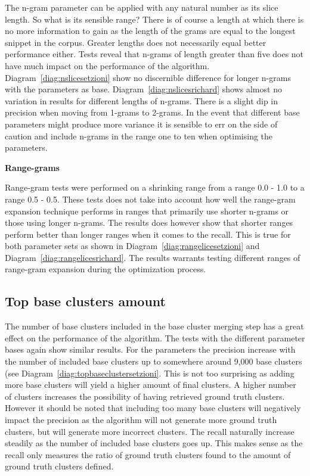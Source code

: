 The n-gram parameter can be applied with any natural number as its slice length. So what is its sensible range? There is of course a length at which there is no more information to gain as the length of the grams are equal to the longest snippet in the corpus. Greater lengths does not necessarily equal better performance either. Tests reveal that n-grams of length greater than five does not have much impact on the performance of the algorithm. Diagram~\ref{diag:nslicesetzioni} show no discernible difference for longer n-grams with the \citeauthor{Oren1998} parameters as base. Diagram~\ref{diag:nslicesrichard} shows almost no variation in results for different lengths of n-grams. There is a slight dip in precision when moving from 1-grams to 2-grams. In the event that different base parameters might produce more variance it is sensible to err on the side of caution and include n-grams in the range one to ten when optimising the parameters.

\textbf{Range-grams}

Range-gram tests were performed on a shrinking range from a range 0.0 - 1.0 to a range 0.5 - 0.5. These tests does not take into account how well the range-gram expansion technique performs in ranges that primarily use shorter n-grams or those using longer n-grams. The results does however show that shorter ranges perform better than longer ranges when it comes to the recall. This is true for both parameter sets as shown in Diagram~\ref{diag:rangelicesetzioni} and Diagram~\ref{diag:rangelicesrichard}. The results warrants testing different ranges of range-gram expansion during the optimization process.

\subsection{Top base clusters amount}
The number of base clusters included in the base cluster merging step has a great effect on the performance of the \CTC algorithm. The tests with the different parameter bases again show similar results. For the \citeauthor{Oren1998} parameters the precision increase with the number of included base clusters up to somewhere around 9,000 base clusters (see Diagram~\ref{diag:topbaseclustersetzioni}. This is not too surprising as adding more base clusters will yield a higher amount of final clusters. A higher number of clusters increases the possibility of having retrieved ground truth clusters. However it should be noted that including too many base clusters will negatively impact the precision as the algorithm will not generate more ground truth clusters, but will generate more incorrect clusters. The recall naturally increase steadily as the number of included base clusters goes up. This makes sense as the recall only measures the ratio of ground truth clusters found to the amount of ground truth clusters defined.

